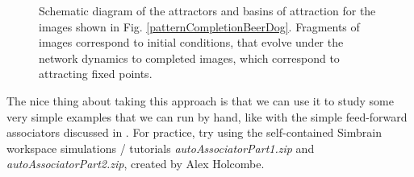 \begin{figure}[h]
\centering
{}
\caption[Pamela Payne, using elements from Hertz, Krogh, and Palmer, 1991 \cite{hertz1991introduction}.]{Schematic diagram of the attractors and basins of attraction for the images shown in Fig. \ref{patternCompletionBeerDog}. Fragments of images correspond to initial conditions, that evolve under the network dynamics to completed images, which correspond to attracting fixed points.}
\label{beerDogAttractors}
\end{figure}
The nice thing about taking this approach is that we can use it to study some very simple examples that we can run by hand, like with the simple feed-forward associators discussed in . For practice, try using the self-contained Simbrain workspace simulations / tutorials \emph{autoAssociatorPart1.zip} and \emph{autoAssociatorPart2.zip}, created by Alex Holcombe. 

